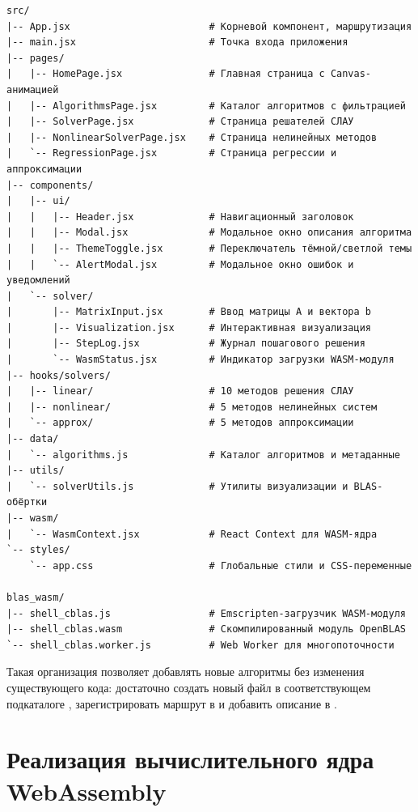 \documentclass[12pt, oneside]{book}
\begin{document}
\begin{verbatim}
src/
|-- App.jsx                        # Корневой компонент, маршрутизация
|-- main.jsx                       # Точка входа приложения
|-- pages/
|   |-- HomePage.jsx               # Главная страница с Canvas-анимацией
|   |-- AlgorithmsPage.jsx         # Каталог алгоритмов с фильтрацией
|   |-- SolverPage.jsx             # Страница решателей СЛАУ
|   |-- NonlinearSolverPage.jsx    # Страница нелинейных методов
|   `-- RegressionPage.jsx         # Страница регрессии и аппроксимации
|-- components/
|   |-- ui/
|   |   |-- Header.jsx             # Навигационный заголовок
|   |   |-- Modal.jsx              # Модальное окно описания алгоритма
|   |   |-- ThemeToggle.jsx        # Переключатель тёмной/светлой темы
|   |   `-- AlertModal.jsx         # Модальное окно ошибок и уведомлений
|   `-- solver/
|       |-- MatrixInput.jsx        # Ввод матрицы A и вектора b
|       |-- Visualization.jsx      # Интерактивная визуализация
|       |-- StepLog.jsx            # Журнал пошагового решения
|       `-- WasmStatus.jsx         # Индикатор загрузки WASM-модуля
|-- hooks/solvers/
|   |-- linear/                    # 10 методов решения СЛАУ
|   |-- nonlinear/                 # 5 методов нелинейных систем
|   `-- approx/                    # 5 методов аппроксимации
|-- data/
|   `-- algorithms.js              # Каталог алгоритмов и метаданные
|-- utils/
|   `-- solverUtils.js             # Утилиты визуализации и BLAS-обёртки
|-- wasm/
|   `-- WasmContext.jsx            # React Context для WASM-ядра
`-- styles/
    `-- app.css                    # Глобальные стили и CSS-переменные

blas_wasm/
|-- shell_cblas.js                 # Emscripten-загрузчик WASM-модуля
|-- shell_cblas.wasm               # Скомпилированный модуль OpenBLAS
`-- shell_cblas.worker.js          # Web Worker для многопоточности
\end{verbatim}

    \quad Такая организация позволяет добавлять новые алгоритмы без изменения существующего кода: достаточно создать новый файл в соответствующем подкаталоге \texttt{}, зарегистрировать маршрут в \texttt{} и добавить описание в \texttt{}.

\section{Реализация вычислительного ядра WebAssembly}
\end{document}
